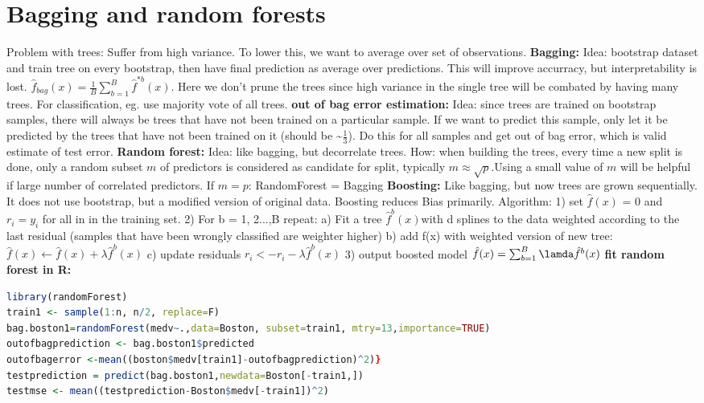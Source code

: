 \section{Bagging and random forests}
Problem with trees: Suffer from high variance. To lower this, we want to average over set of observations. 
\textbf{Bagging: } Idea: bootstrap dataset and train tree on every bootstrap, then have final prediction as average over predictions. This will improve accurracy, but interpretability is lost. $\hat f_{bag}(x)= \frac{1}{B} \sum_{b=1}^B \hat f^{*b}(x)$. Here we don't prune the trees since high variance in the single tree will be combated by having many trees. For classification, eg. use majority vote of all trees.
\textbf{out of bag error estimation: } Idea: since trees are trained on bootstrap samples, there will always be trees that have not been trained on a particular sample. If we want to predict this sample, only let it be predicted by the trees that have not been trained on it (should be \textasciitilde $\frac{1}{3}$). Do this for all samples and get out of bag error, which is valid estimate of test error. 
\textbf{Random forest: } Idea: like bagging, but decorrelate trees. How: when building the trees, every time a new split is done, only a random subset $m$ of predictors is considered as candidate for split, typically $m \approx \sqrt{p}$.Using a small value of $m$ will be helpful if large number of correlated predictors. If $m=p$: RandomForest = Bagging
\textbf{Boosting: } Like bagging, but now trees are grown sequentially. It does not use bootstrap, but a modified version of original data. Boosting reduces Bias primarily. Algorithm: 
1) set $\hat f(x)$ = 0 and $r_i = y_i$ for all in in the training set.
2) For b = 1, 2...,B repeat:
a) Fit a tree $\hat f^b(x)$with d splines to the data weighted according to the last residual (samples that have been wrongly classified are weighter higher)
b) add f(x) with weighted version of new tree: $ \hat f(x) \leftarrow \hat f(x) + \lambda \hat f^b(x) $
c) update residuals $r_i <- r_i - \lambda \hat f^b(x)$
3) output boosted model $\hat f(x) = \sum_{b=1}^B \lamda \hat f^b(x)$
\textbf{fit random forest in R: } \begin{lstlisting}[language = R]
library(randomForest)
train1 <- sample(1:n, n/2, replace=F)
bag.boston1=randomForest(medv~.,data=Boston, subset=train1, mtry=13,importance=TRUE)
outofbagprediction <- bag.boston1$predicted
outofbagerror <-mean((boston$medv[train1]-outofbagprediction)^2)}
testprediction = predict(bag.boston1,newdata=Boston[-train1,])
testmse <- mean((testprediction-Boston$medv[-train1])^2) \end{lstlisting}